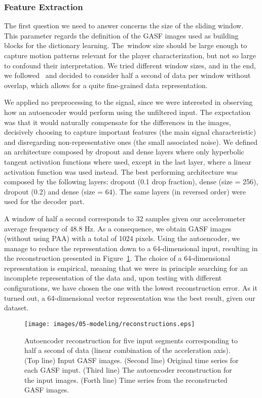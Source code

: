 \subsubsection{Feature Extraction}

The first question we need to answer concerns the size of the sliding window. This parameter regards the definition of the GASF images used as building blocks for the dictionary learning. The~window size should be large enough to capture motion patterns relevant for the player characterization, but not so large to confound their interpretation. We tried different window sizes, and in the end, we followed~\cite{oliveira_activity_2017} and decided to consider half a second of data per window without overlap, which allows for a quite fine-grained data representation.

We applied no preprocessing to the signal, since we were interested in observing how an autoencoder would perform using the unfiltered input. The expectation was that it would naturally compensate for the differences in the images, decisively choosing to capture important features (the main signal characteristic) and disregarding non-representative ones (the small associated noise). We defined an architecture composed by dropout and dense layers where only hyperbolic tangent activation functions where used, except in the last layer, where a linear activation function was used instead. The best performing architecture was composed by the following layers: dropout (0.1 drop fraction), dense (size = 256), dropout (0.2) and dense (size = 64). The same layers (in reversed order) were used for the decoder part.

A window of half a second corresponds to 32 samples given our accelerometer average frequency of 48.8 Hz. As a consequence, we obtain GASF images (without using PAA) with a total of 1024 pixels. Using the autoencoder, we manage to reduce the representation down to a 64-dimensional input, resulting in the reconstruction presented in Figure~\ref{figure:reconstruction}. The choice of a 64-dimensional representation is empirical, meaning that we were in principle searching for an incomplete representation of the data and, upon testing with different configurations, we have chosen the one with the lowest reconstruction error. As it turned out, a 64-dimensional vector representation was the best result, given our dataset. 

\begin{figure}[H]
	\centering
	\texttt{[image: images/05-modeling/reconstructions.eps]}
	\caption{Autoencoder reconstruction for five input segments corresponding to half a second of data (linear combination of the acceleration axis). ({Top line}) Input GASF images. ({Second line}) Original time series for each GASF input. ({Third line}) The autoencoder reconstruction for the input images. ({Forth line}) Time series from the reconstructed GASF images.}
  \label{figure:reconstruction}
\end{figure}

